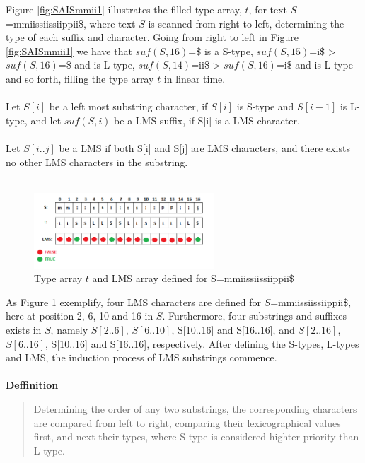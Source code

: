 \documentclass[12pt]{article} %
\begin{document}
Figure \ref{fig:SAISmmii1} illustrates the filled type array, $t$, for text $S$=mmiissiissiippii\$, where text $S$ is scanned from right to left, determining the type of each suffix and character. Going from right to left in Figure \ref{fig:SAISmmii1} we have that $suf(S,16)$=\$ is a S-type, $suf(S,15)$=i\$ > $suf(S,16)$=\$ and is L-type, $suf(S,14)$=ii\$ > $suf(S,16)$=i\$ and is L-type and so forth, filling the type array $t$ in linear time.
\\ \\
Let $S[i]$ be a left most substring character, if $S[i]$ is S-type and $S[i-1]$ is L-type, and let $suf(S,i)$ be a LMS suffix, if S[i] is a LMS character.
\\ \\
Let $S[i..j]$ be a LMS if both S[i] and S[j] are LMS characters, and there exists no other LMS characters in the substring.
\\ \\

\begin{figure}[H]
    \centering
    \includegraphics[width=0.6\textwidth]{SAISmmii2}
    \captionsetup{width=0.8\textwidth}
    \caption{Type array $t$ and LMS array defined for S=mmiissiissiippii\$}
    \label{fig:SAISmmii2}
\end{figure}

As Figure \ref{fig:SAISmmii2} exemplify, four LMS characters are defined for $S$=mmiissiissiippii\$, here at position 2, 6, 10 and 16 in $S$. Furthermore, four substrings and suffixes exists in $S$, namely $S[2..6]$, $S[6..10]$, S[10..16] and S[16..16], and $S[2..16]$, $S[6..16]$, S[10..16] and S[16..16], respectively.
After defining the S-types, L-types and LMS, the induction process of LMS substrings commence.
\\ \\

\textbf{Deffinition}
\begin{quote}
Determining the order of any two substrings, the corresponding characters are compared from left to right, comparing their lexicographical values first, and next their types, where S-type is considered highter priority than L-type.
\end{quote}
\end{document}
